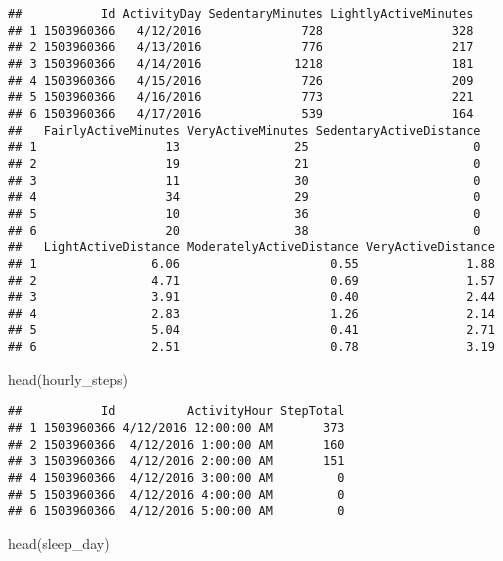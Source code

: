 \documentclass[
]{article}
\newenvironment{Shaded}{\begin{snugshade}}{\end{snugshade}}
\newcommand{\FunctionTok}[1]{\textcolor[rgb]{0.00,0.00,0.00}{#1}}
\newcommand{\NormalTok}[1]{#1}
\begin{document}
\begin{verbatim}
##           Id ActivityDay SedentaryMinutes LightlyActiveMinutes
## 1 1503960366   4/12/2016              728                  328
## 2 1503960366   4/13/2016              776                  217
## 3 1503960366   4/14/2016             1218                  181
## 4 1503960366   4/15/2016              726                  209
## 5 1503960366   4/16/2016              773                  221
## 6 1503960366   4/17/2016              539                  164
##   FairlyActiveMinutes VeryActiveMinutes SedentaryActiveDistance
## 1                  13                25                       0
## 2                  19                21                       0
## 3                  11                30                       0
## 4                  34                29                       0
## 5                  10                36                       0
## 6                  20                38                       0
##   LightActiveDistance ModeratelyActiveDistance VeryActiveDistance
## 1                6.06                     0.55               1.88
## 2                4.71                     0.69               1.57
## 3                3.91                     0.40               2.44
## 4                2.83                     1.26               2.14
## 5                5.04                     0.41               2.71
## 6                2.51                     0.78               3.19
\end{verbatim}

\begin{Shaded}
\begin{Highlighting}[]
\FunctionTok{head}\NormalTok{(hourly\_steps)}
\end{Highlighting}
\end{Shaded}

\begin{verbatim}
##           Id          ActivityHour StepTotal
## 1 1503960366 4/12/2016 12:00:00 AM       373
## 2 1503960366  4/12/2016 1:00:00 AM       160
## 3 1503960366  4/12/2016 2:00:00 AM       151
## 4 1503960366  4/12/2016 3:00:00 AM         0
## 5 1503960366  4/12/2016 4:00:00 AM         0
## 6 1503960366  4/12/2016 5:00:00 AM         0
\end{verbatim}

\begin{Shaded}
\begin{Highlighting}[]
\FunctionTok{head}\NormalTok{(sleep\_day)}
\end{Highlighting}
\end{Shaded}
\end{document}
